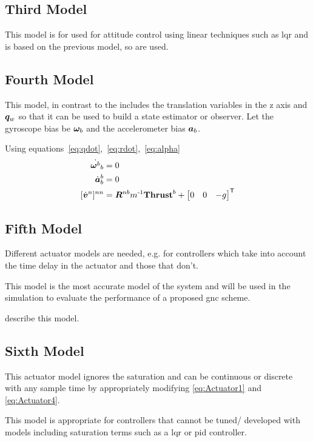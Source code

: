 \subsection{Third Model} 
\label{Attitude Model}
This model is for used for \gls{attitude} control using linear techniques such as \gls{lqr} and is based on the previous model,  so  are used.
%
\subsection{Fourth Model} 
\label{KF Model}
This model, in contrast to the  includes the translation variables in the z axis and $\bm q_w$ so that it can be used to build a state estimator or observer.
Let the gyroscope bias be $\bm \omega_b$ and the accelerometer bias $\bm a_b$.

Using equations~\eqref{eq:qdot},~\eqref{eq:rdot},~\eqref{eq:alpha}
\begin{align}
    \dot{\m \omega^b}_b &= 0\\
    \dot{\m a}^b_b &= 0 \\
    [\dot{\m v}^n]^{nn} &= \m R^{nb} m\inv \mathbf{Thrust}^b + 
    \begin{bmatrix}
        0 & 0 & -g
    \end{bmatrix}\tran  \\
\end{align}
%
\subsection{Fifth Model} 
\label{Accurate Actuator}
Different actuator models are needed, e.g. for controllers which take into account the time delay in the actuator and those that don't. 

This model is the most accurate model of the system and will be used in the simulation to evaluate the performance of a proposed \gls{gnc} scheme.

 describe this model.
%
\subsection{Sixth Model} 
\label{No Saturation Actuator}
This actuator model ignores the saturation and can be continuous or discrete with any sample time by appropriately modifying \eqref{eq:Actuator1} and \eqref{eq:Actuator4}.

This model is appropriate for controllers that cannot be tuned/ developed with models including saturation terms such as a \gls{lqr} or \gls{pid} controller.

